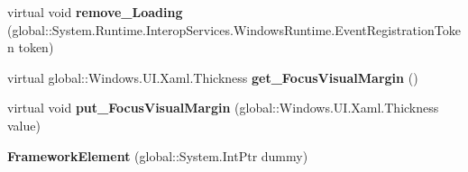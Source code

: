 \begin{DoxyCompactItemize}
\mbox{\label{class_windows_1_1_u_i_1_1_xaml_1_1_framework_element_a6ba35fb963a416a7b03b6ee63a82c138}} 
virtual void {\bfseries remove\+\_\+\+Loading} (global\+::\+System.\+Runtime.\+Interop\+Services.\+Windows\+Runtime.\+Event\+Registration\+Token token)
\item 
\mbox{\label{class_windows_1_1_u_i_1_1_xaml_1_1_framework_element_a1a058a053cdfa2551f3841b97735511c}} 
virtual global\+::\+Windows.\+U\+I.\+Xaml.\+Thickness {\bfseries get\+\_\+\+Focus\+Visual\+Margin} ()
\item 
\mbox{\label{class_windows_1_1_u_i_1_1_xaml_1_1_framework_element_abf95cce4264f515ac3309b6484f5835c}} 
virtual void {\bfseries put\+\_\+\+Focus\+Visual\+Margin} (global\+::\+Windows.\+U\+I.\+Xaml.\+Thickness value)
\item 
\mbox{\label{class_windows_1_1_u_i_1_1_xaml_1_1_framework_element_a1af8b4a08c326371edc3d91d80b4db81}} 
{\bfseries Framework\+Element} (global\+::\+System.\+Int\+Ptr dummy)
\end{DoxyCompactItemize}
